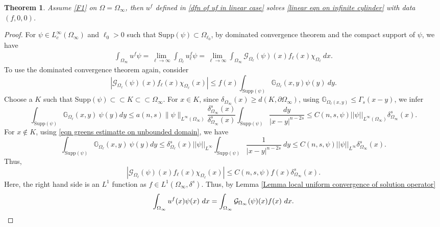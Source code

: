 \documentclass{amsart}
\newtheorem{theorem}{Theorem}[section]
\newcommand{\g}[1]{\mathcal{G}_{#1}}
\newcommand{\gk}[1]{\mathbb{G}_{#1}}
\newcommand{\ul}{u_{\ell}}
\begin{document}
\begin{theorem}
    Assume \ref{F1} on $\Omega=\Omega_{\infty}$, then $u^{f}$ defined in \eqref{dfn of uf in linear case} solves \eqref{linear eqn on infinite cylinder} with data $(f,0,0)$.
\end{theorem}
\begin{proof}
    For $\psi\in L^{\infty}_{c}(\Omega_{\infty})$ and $\ell_{0}>0$ such that Supp$(\psi)\subset \Omega_{\ell_{0}}$, by dominated convergence theorem and the compact support of $\psi$, we have
\begin{equation*}
\begin{split}
    \int_{\Omega_{\infty}}u^{f}\psi=\lim_{\ell\to\infty}\int_{\Omega_{\ell}}\ul^{f} \psi=\lim_{\ell\to\infty}\int_{\Omega_{\infty}}\g{\Omega_{\ell}}(\psi)(x)f_{\ell}(x)\chi_{\Omega_{\ell}}\ dx .
    \end{split}
\end{equation*}
To use the dominated convergence theorem again, consider
\begin{equation*}
        |\g{\Omega_{\ell}}(\psi)(x) f_{\ell}(x)\chi_{\Omega_{\ell}}(x)|\leq f(x)\int_{\text{Supp}(\psi)}\gk{\Omega_{\ell}}(x,y) \psi(y)\ dy .
   \end{equation*}
   Choose a $ K$ such that Supp$(\psi)\subset\subset K\subset\subset \Omega_{\infty}$. For $x\in K$, since $\delta_{\Omega_{\infty}}(x)\geq d(K,\partial\Omega_{\infty})$, using $\gk{\Omega_{\ell}(x,y)}\leq \Gamma_{s}(x-y)$, we infer
   \begin{equation*}
       \int_{\text{Supp}(\psi)}\gk{\Omega_{\ell}}(x,y)\ \psi(y) dy \leq a(n,s)\|\psi\|_{L^{\infty}(\Omega_{\infty})}\frac{\delta_{\Omega_{\infty}}^{s}(x)}{\delta_{\Omega_{\infty}}^{s}(x)}\int_{\text{Supp}(\psi)}\frac{dy}{|x-y|^{n-2s}}\leq C(n,s,\psi)||\psi||_{L^{\infty}(\Omega_{\infty})} \delta_{\Omega_{\infty}}^{s}(x).
   \end{equation*}
   For $x\notin K$, using \eqref{eqn greens estimatte on unbounded domain}, we have
   \begin{equation*}
       \int_{\text{Supp}(\psi)}\gk{\Omega_{\ell}}(x,y)\ \psi(y) dy \leq \delta_{\Omega_{\ell}}^{s}(x)||\psi||_{L^{\infty}}\int_{\text{Supp}(\psi)}\frac{1}{|x-y|^{n-2s}}\ dy \leq C(n,s,\psi)||\psi||_{L^{\infty}}\delta_{\Omega_{\infty}}^{s}(x).
   \end{equation*}
   Thus, 
   \begin{equation*}
        |\g{\Omega_{\ell}}(\psi)(x) f_{\ell}(x)\chi_{\Omega_{\ell}}(x)|\leq C(n,s,\psi) f(x)\delta_{\Omega_{\infty}}^{s}(x).
   \end{equation*}
   Here, the right hand side is an $L^{1}$ function as $f\in L^{1}(\Omega_{\infty},\delta^{s})$.  Thus, by Lemma \ref{Lemma local uniform convergence of solution operator}
\begin{equation*}
   \int_{\Omega_{\infty}}u^{f}(x) \psi(x)\ dx =\int_{\Omega_{\infty}} \g{\Omega_{\infty}}(\psi)(x) f(x)\ dx.\qedhere
\end{equation*}
\end{proof}
\end{document}
